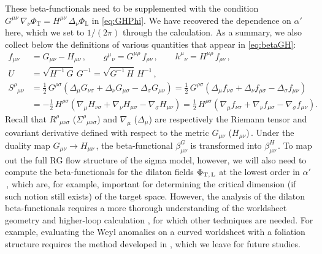 \documentclass[11pt]{article}
\newcommand{\lr}{\left (}
\newcommand{\rr}{\right )}
\begin{document}
%
These beta-functionals need to be supplemented with the condition $G^{\mu\nu} \, \nabla_{\!\nu} \Phi_\text{T} = H^{\mu\nu} \, \Delta_\nu \Phi_\text{L}$ in \eqref{eq:GHPhi}.
%
We have recovered the dependence on $\alpha'$ here, which we set to $1/(2\pi)$ through the calculation. As a summary, we also collect below the definitions of various quantities that appear in \eqref{eq:betaGH}:
%
\begin{subequations}
\begin{align}
	f_{\mu\nu} & = G_{\mu\nu} - H_{\mu\nu}\,, 
		\qquad%
	g^\mu{}_\nu = G^{\mu\rho} \, f_{\rho\nu}\,, 
		\qquad%
	h^\mu{}_\nu = H^{\mu\rho} \, f_{\rho\nu}\,, \\[8pt]
	U & = \sqrt{H^{-1} \, G} \, G^{-1} = \sqrt{G^{-1} \, H} \, H^{-1}\,, \\[4pt]
	S^\rho{}_{\mu\nu} 		
		& = \frac{1}{2} \, G^{\rho\sigma} \lr \Delta_\mu G_{\nu\sigma} + \Delta_\nu G_{\mu\sigma} - \Delta_\sigma G_{\mu\nu} \rr = \frac{1}{2} \, G^{\rho\sigma} \lr \Delta_\mu f_{\nu\sigma} + \Delta_\nu f_{\mu\sigma} - \Delta_\sigma f_{\mu\nu} \rr \\[2pt]
		& = - \frac{1}{2} \, H^{\rho\sigma} \lr \nabla_{\!\mu} H_{\nu\sigma} + \nabla_{\!\nu} H_{\mu\sigma} - \nabla_{\!\sigma} H_{\mu\nu} \rr = \frac{1}{2} \, H^{\rho\sigma} \lr \nabla_{\!\mu} f_{\nu\sigma} + \nabla_{\!\nu} f_{\mu\sigma} - \nabla_{\!\sigma} f_{\mu\nu} \rr.
\end{align}
\end{subequations}
%
Recall that $R^\rho{}_{\mu\nu\sigma}$ ($\Sigma^\rho{}_{\mu\nu\sigma}$) and $\nabla_{\!\mu}$ ($\Delta_\mu$) are respectively the Riemann tensor and  covariant derivative defined with respect to the metric $G_{\mu\nu}$ ($H_{\mu\nu}$)\,. Under the duality map $G_{\mu\nu} \rightarrow H_{\mu\nu}$\,,
%
the beta-functional $\beta^G_{\mu\nu}$ is transformed into $\beta^H_{\mu\nu}$\,. To map out the full RG flow structure of the sigma model, however, we will also need to compute the beta-functionals for the dilaton fields $\Phi_\text{T,\,L}$ at the lowest order in $\alpha'$\,, which are, for example, important for determining the critical dimension (if such notion still exists) of the target space. However, the analysis of the dilaton beta-functionals requires a more thorough understanding of the worldsheet geometry and higher-loop calculation \cite{Callan:1989nz}, for which other techniques are needed. For example, evaluating the Weyl anomalies on a curved worldsheet with a foliation structure requires the method developed in \cite{Grosvenor:2021zvq}, which we leave for future studies.
\end{document}
